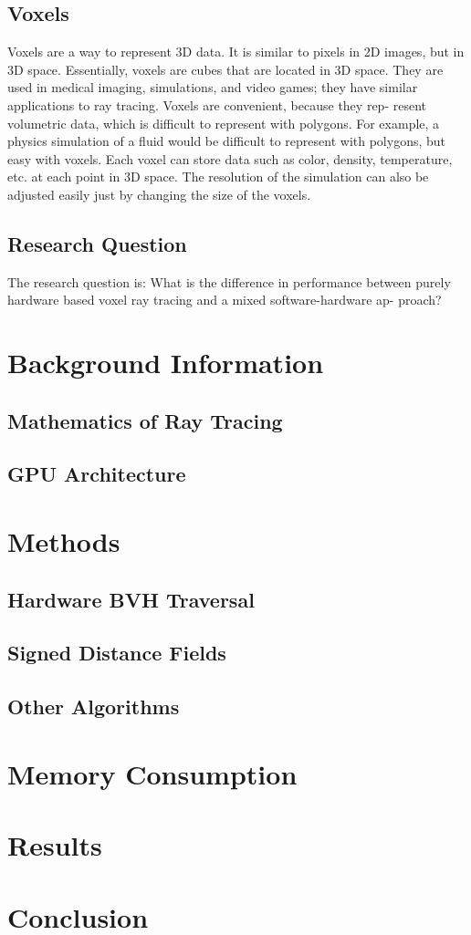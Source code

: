 \documentclass[12pt]{article}
\begin{document}
\subsection{Voxels}

Voxels are a way to represent 3D data. It is similar to pixels in 2D images,
but in 3D space. Essentially, voxels are cubes that are located in 3D space.
They are used in medical imaging, simulations, and video games; they have
similar applications to ray tracing. Voxels are convenient, because they rep-
resent volumetric data, which is difficult to represent with polygons. For
example, a physics simulation of a fluid would be difficult to represent with
polygons, but easy with voxels. Each voxel can store data such as color,
density, temperature, etc. at each point in 3D space. The resolution of the
simulation can also be adjusted easily just by changing the size of the voxels.

\subsection{Research Question}

The research question is: What is the difference in performance between
purely hardware based voxel ray tracing and a mixed software-hardware ap-
proach?

\section{Background Information}
\subsection{Mathematics of Ray Tracing}
\subsection{GPU Architecture}

\section{Methods}
\subsection{Hardware BVH Traversal}
\subsection{Signed Distance Fields}
\subsection{Other Algorithms}

\section{Memory Consumption}

\section{Results}

\section{Conclusion}
\end{document}
